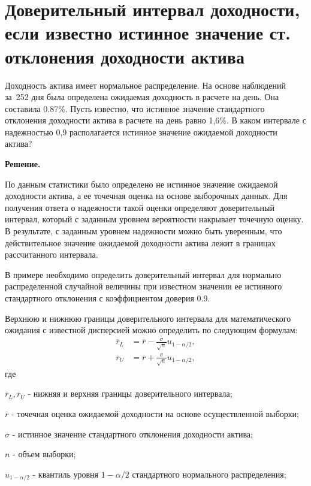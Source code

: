 \documentclass[12pt,a4paper]{article}
\begin{document}
\section{Доверительный интервал доходности, если известно истинное значение ст. отклонения доходности актива}
\begin{taskrus}
Доходность актива имеет нормальное распределение. На основе наблюдений за~252 дня была определена ожидаемая доходность в расчете на день. Она составила 0.87\%. Пусть известно, что истинное значение стандартного отклонения доходности актива в расчете на день равно 1,6\%. В каком интервале с надежностью 0,9 располагается истинное значение ожидаемой доходности актива?

\textbf{Решение.}

По данным статистики было определено не истинное значение ожидаемой доходности актива, а ее точечная оценка на основе выборочных данных. Для получения ответа о надежности такой оценки определяют доверительный интервал, который с заданным уровнем вероятности накрывает точечную оценку. В результате, с заданным уровнем надежности можно быть уверенным, что действительное значение ожидаемой доходности актива лежит в границах рассчитанного интервала.

В примере необходимо определить доверительный интервал для нормально распределенной случайной величины при известном значении ее истинного стандартного отклонения с коэффициентом доверия 0.9.

Верхнюю и нижнюю границы доверительного интервала для математического ожидания с известной дисперсией можно определить по следующим формулам:
\begin{align}
\label{eq:yield_low}
\overline{r}_L &=\overline{r}-\frac{\sigma}{\sqrt{n}}u_{1-\alpha/2},\\[8pt]
\label{eq:yield_upper}
\overline{r}_U &=\overline{r}+\frac{\sigma}{\sqrt{n}}u_{1-\alpha/2},
\end{align}
где

$\overline{r}_L, \overline{r}_U$ - нижняя и верхняя  границы доверительного интервала;

$\overline{r}$ - точечная оценка ожидаемой доходности на основе осуществленной выборки;

$\sigma$ - истинное значение стандартного отклонения доходности актива;

$n$ - объем выборки;

$u_{1-\alpha/2}$ - квантиль уровня $1-\alpha/2$ стандартного нормального распределения;


\end{taskrus}
\end{document}
